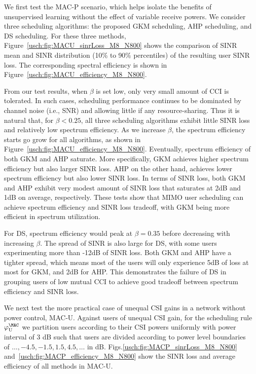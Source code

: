 We first test the MAC-P scenario, which helps isolate the benefits of unsupervised learning without the effect of variable receive powers. We consider three scheduling algorithms: the proposed GKM scheduling, AHP scheduling, and DS scheduling. 
For these three methods, Figure~\ref{usch:fig:MACU_sinrLoss_M8_N800} shows the comparison of SINR mean and SINR distribution (10\% to 90\% percentiles) of the resulting user SINR loss. The corresponding spectral efficiency is shown in Figure~\ref{usch:fig:MACU_efficiency_M8_N800}.

From our test results, when $\beta$ is set low, only very small amount of CCI is tolerated. 
In such cases, scheduling performance continues to be dominated by channel noise (i.e., SNR) and allowing little if any resource-sharing. 
Thus it is natural that, for $\beta <0.25$, all three scheduling algorithms exhibit little SINR loss and relatively low spectrum efficiency. 
As we increase $\beta$, the spectrum efficiency starts go grow for all algorithms, as shown in Figure~\ref{usch:fig:MACU_efficiency_M8_N800}. 
Eventually, spectrum efficiency of both GKM and AHP saturate.  
More specifically, GKM achieves higher spectrum efficiency but also larger SINR loss. 
AHP on the other hand, achieves lower spectrum efficiency but also lower SINR loss. 
In terms of SINR loss, both GKM and AHP exhibit very modest amount of SINR loss that saturates at 2dB and 1dB on average, respectively. 
These tests show that MIMO user scheduling can achieve spectrum efficiency and SINR loss tradeoff, with GKM being more efficient in spectrum utilization. 

For DS, spectrum efficiency would peak at $\beta=0.35$ before decreasing with increasing $\beta$. 
The spread of SINR is also large for DS, with some users experimenting more than -12dB of SINR loss. 
Both GKM and AHP have a tighter spread, which means most of the users will only experience 5dB of loss at most for GKM, and 2dB for AHP. 
This demonstrates the failure of DS in grouping users of low mutual CCI to achieve good tradeoff between spectrum efficiency and SINR loss.

We next test the more practical case of unequal CSI gains in
a network without power control, MAC-U. Against users of unequal CSI gain, for the scheduling rule $\varphi_{\mathrm{U}}^{\MAC}$ we partition users according to their CSI powers uniformly with power interval of $3$ dB such that users are divided according to power level boundaries of $\ldots,-4.5,-1.5,1.5,4.5,\ldots$ in dB. 
Figs.\ref{usch:fig:MACP_sinrLoss_M8_N800} and~\ref{usch:fig:MACP_efficiency_M8_N800} show the SINR loss and average efficiency of all methods in MAC-U.

